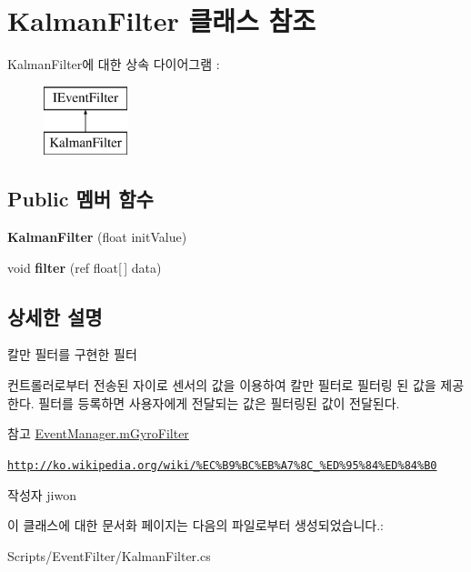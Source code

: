 \hypertarget{class_kalman_filter}{}\section{Kalman\+Filter 클래스 참조}
\label{class_kalman_filter}
Kalman\+Filter에 대한 상속 다이어그램 \+: \begin{figure}[H]
\begin{center}
\leavevmode
\includegraphics[height=2.000000cm]{class_kalman_filter}
\end{center}
\end{figure}
\subsection*{Public 멤버 함수}
\begin{DoxyCompactItemize}
\item 
\hypertarget{class_kalman_filter_acd6545f9bd224b877adf564460f8bc73}{}{\bfseries Kalman\+Filter} (float init\+Value)\label{class_kalman_filter_acd6545f9bd224b877adf564460f8bc73}

\item 
\hypertarget{class_kalman_filter_a9a7d63d4acea7ce12b83b00f9d02f7cb}{}void {\bfseries filter} (ref float\mbox{[}$\,$\mbox{]} data)\label{class_kalman_filter_a9a7d63d4acea7ce12b83b00f9d02f7cb}

\end{DoxyCompactItemize}


\subsection{상세한 설명}
칼만 필터를 구현한 필터

컨트롤러로부터 전송된 자이로 센서의 값을 이용하여 칼만 필터로 필터링 된 값을 제공한다. 필터를 등록하면 사용자에게 전달되는 값은 필터링된 값이 전달된다. \begin{DoxySeeAlso}{참고}
\hyperlink{class_event_manager_a7cee85488f5d7220c102cd945b1f494a}{Event\+Manager.\+m\+Gyro\+Filter} 

\href{http://ko.wikipedia.org/wiki/%EC%B9%BC%EB%A7%8C_%ED%95%84%ED%84%B0}{\tt http\+://ko.\+wikipedia.\+org/wiki/\%\+E\+C\%\+B9\%\+B\+C\%\+E\+B\%\+A7\%8\+C\+\_\+\%\+E\+D\%95\%84\%\+E\+D\%84\%\+B0} 
\end{DoxySeeAlso}
\begin{DoxyAuthor}{작성자}
jiwon 
\end{DoxyAuthor}


이 클래스에 대한 문서화 페이지는 다음의 파일로부터 생성되었습니다.\+:\begin{DoxyCompactItemize}
\item 
Scripts/\+Event\+Filter/Kalman\+Filter.\+cs\end{DoxyCompactItemize}
